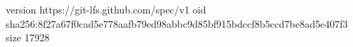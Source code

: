 version https://git-lfs.github.com/spec/v1
oid sha256:8f27a67f0cad5e778aafb79ed98abbc9d85bf915bdccf8b5ccd7be8ad5e407f3
size 17928
